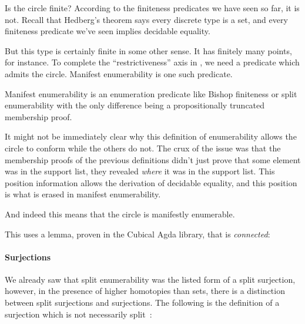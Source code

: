 Is the circle finite?
According to the finiteness predicates we have seen so far, it is not.
Recall that Hedberg's theorem says every discrete type is a set, and
every finiteness predicate we've seen implies decidable
equality.

But this type is certainly finite in some other sense.
It has finitely many points, for instance.
To complete the ``restrictiveness'' axis in , we
need a predicate which admits the circle.
Manifest enumerability is one such predicate.
\begin{definition}
  Manifest enumerability is an enumeration predicate like Bishop finiteness or
  split enumerability with the only difference being a propositionally truncated
  membership proof.
\end{definition}

It might not be immediately clear why this definition of enumerability allows
the circle to conform while the others do not.
The crux of the issue was that the membership proofs of the previous definitions
didn't just prove that some element was in the support list, they revealed
\emph{where} it was in the support list.
This position information allows the derivation of decidable equality, and this
position is what is erased in manifest enumerability.

And indeed this means that the circle is manifestly enumerable.

This uses a lemma, proven in the Cubical Agda library, that
 is \emph{connected}:

\paragraph{Surjections}
We already saw that split enumerability was the listed form of a split
surjection, however, in the presence of higher homotopies than sets, there is a
distinction between split surjections and surjections.
The following is the definition of a surjection which is not necessarily
split~\citep[definition 4.6.1]{hottbook}:
\begin{paracol}{2}
  \switchcolumn%
\end{paracol}

